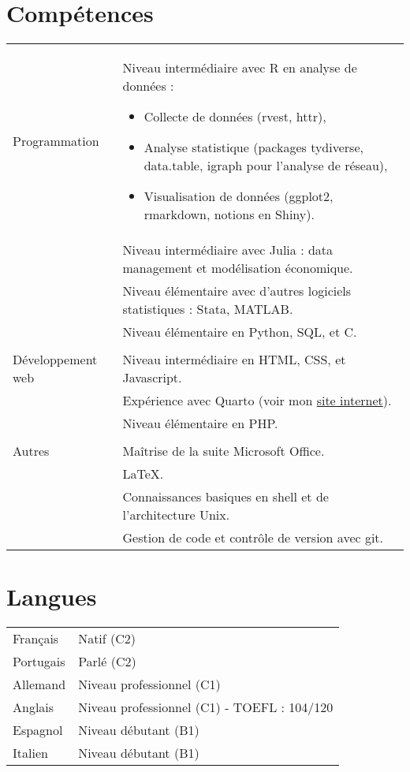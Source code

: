\documentclass[a4paper,12pt]{article}
\begin{document}
\section{Compétences}
\begin{tabularx}{\linewidth}{@{}l X@{}}
Programmation & 
Niveau intermédiaire avec R en analyse de données :
\begin{itemize}
\item Collecte de données (rvest, httr),
\item Analyse statistique (packages tydiverse, data.table, igraph pour l'analyse de réseau),
\item Visualisation de données (ggplot2, rmarkdown, notions en Shiny).
\end{itemize} \\
& Niveau intermédiaire avec Julia : data management et modélisation économique.\\
& Niveau élémentaire avec d'autres logiciels statistiques : Stata, MATLAB. \\
& Niveau élémentaire en Python, SQL, et C. \\
& \\
Développement web &  Niveau intermédiaire en HTML, CSS, et Javascript. \\
& Expérience avec Quarto (voir mon \href{https://www.paulogcd.com}{site internet}). \\
& Niveau élémentaire en PHP.\\
& \\
Autres & Maîtrise de la suite Microsoft Office. \\
&  \LaTeX. \\
& Connaissances basiques en shell et de l'architecture Unix. \\
& Gestion de code et contrôle de version avec git.\\
\end{tabularx}

\section{Langues}
\begin{tabularx}{\linewidth}{@{}l X@{}}
Français &  \normalsize{Natif (C2)}\\
Portugais &  \normalsize{Parlé (C2)}\\
Allemand &  \normalsize{Niveau professionnel (C1)}\\  
Anglais &  \normalsize{Niveau professionnel (C1) - TOEFL : 104/120}\\ 
Espagnol & \normalsize{Niveau débutant (B1)}\\ 
Italien & \normalsize{Niveau débutant (B1)}\\ 
\end{tabularx}

\vfill
{}
\end{document}
